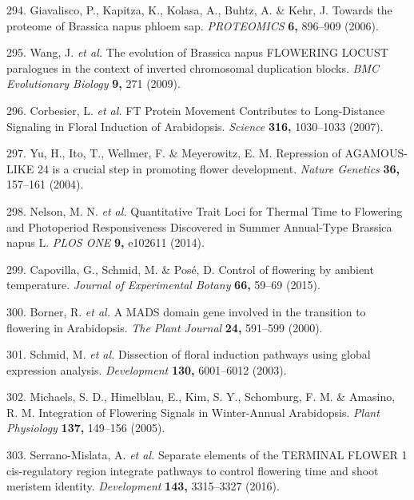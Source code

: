\documentclass[12pt,]{book}
\begin{document}
\hypertarget{ref-giavalisco_towards_2006}{}
294. Giavalisco, P., Kapitza, K., Kolasa, A., Buhtz, A. \& Kehr, J.
Towards the proteome of Brassica napus phloem sap. \emph{PROTEOMICS}
\textbf{6,} 896--909 (2006).

\hypertarget{ref-wang_evolution_2009}{}
295. Wang, J. \emph{et al.} The evolution of Brassica napus FLOWERING
LOCUST paralogues in the context of inverted chromosomal duplication
blocks. \emph{BMC Evolutionary Biology} \textbf{9,} 271 (2009).

\hypertarget{ref-corbesier_ft_2007}{}
296. Corbesier, L. \emph{et al.} FT Protein Movement Contributes to
Long-Distance Signaling in Floral Induction of Arabidopsis.
\emph{Science} \textbf{316,} 1030--1033 (2007).

\hypertarget{ref-yu_repression_2004}{}
297. Yu, H., Ito, T., Wellmer, F. \& Meyerowitz, E. M. Repression of
AGAMOUS-LIKE 24 is a crucial step in promoting flower development.
\emph{Nature Genetics} \textbf{36,} 157--161 (2004).

\hypertarget{ref-nelson_quantitative_2014}{}
298. Nelson, M. N. \emph{et al.} Quantitative Trait Loci for Thermal
Time to Flowering and Photoperiod Responsiveness Discovered in Summer
Annual-Type Brassica napus L. \emph{PLOS ONE} \textbf{9,} e102611
(2014).

\hypertarget{ref-capovilla_control_2015}{}
299. Capovilla, G., Schmid, M. \& Posé, D. Control of flowering by
ambient temperature. \emph{Journal of Experimental Botany} \textbf{66,}
59--69 (2015).

\hypertarget{ref-borner_mads_2000}{}
300. Borner, R. \emph{et al.} A MADS domain gene involved in the
transition to flowering in Arabidopsis. \emph{The Plant Journal}
\textbf{24,} 591--599 (2000).

\hypertarget{ref-schmid_dissection_2003}{}
301. Schmid, M. \emph{et al.} Dissection of floral induction pathways
using global expression analysis. \emph{Development} \textbf{130,}
6001--6012 (2003).

\hypertarget{ref-michaels_integration_2005}{}
302. Michaels, S. D., Himelblau, E., Kim, S. Y., Schomburg, F. M. \&
Amasino, R. M. Integration of Flowering Signals in Winter-Annual
Arabidopsis. \emph{Plant Physiology} \textbf{137,} 149--156 (2005).

\hypertarget{ref-serrano_mislata_separate_2016}{}
303. Serrano-Mislata, A. \emph{et al.} Separate elements of the TERMINAL
FLOWER 1 cis-regulatory region integrate pathways to control flowering
time and shoot meristem identity. \emph{Development} \textbf{143,}
3315--3327 (2016).
\end{document}
